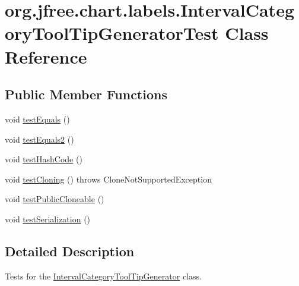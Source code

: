 \hypertarget{classorg_1_1jfree_1_1chart_1_1labels_1_1_interval_category_tool_tip_generator_test}{}\section{org.\+jfree.\+chart.\+labels.\+Interval\+Category\+Tool\+Tip\+Generator\+Test Class Reference}
\label{classorg_1_1jfree_1_1chart_1_1labels_1_1_interval_category_tool_tip_generator_test}
\subsection*{Public Member Functions}
\begin{DoxyCompactItemize}
\item 
void \mbox{\hyperlink{classorg_1_1jfree_1_1chart_1_1labels_1_1_interval_category_tool_tip_generator_test_af10b3cec77fa70d35671408d3254f662}{test\+Equals}} ()
\item 
void \mbox{\hyperlink{classorg_1_1jfree_1_1chart_1_1labels_1_1_interval_category_tool_tip_generator_test_aa8210340e8f440c2a679054c2d3cdc5e}{test\+Equals2}} ()
\item 
void \mbox{\hyperlink{classorg_1_1jfree_1_1chart_1_1labels_1_1_interval_category_tool_tip_generator_test_a1a005588b2204d54be1a3e8fc2eb9704}{test\+Hash\+Code}} ()
\item 
void \mbox{\hyperlink{classorg_1_1jfree_1_1chart_1_1labels_1_1_interval_category_tool_tip_generator_test_a89334c34c2360764355484ba0e68b4ca}{test\+Cloning}} ()  throws Clone\+Not\+Supported\+Exception 
\item 
void \mbox{\hyperlink{classorg_1_1jfree_1_1chart_1_1labels_1_1_interval_category_tool_tip_generator_test_ac05c0e26b99a3c728a50c37a8ae7f16f}{test\+Public\+Cloneable}} ()
\item 
void \mbox{\hyperlink{classorg_1_1jfree_1_1chart_1_1labels_1_1_interval_category_tool_tip_generator_test_a9b6f2892021c0e6766ce2a5aa9af2351}{test\+Serialization}} ()
\end{DoxyCompactItemize}


\subsection{Detailed Description}
Tests for the \mbox{\hyperlink{classorg_1_1jfree_1_1chart_1_1labels_1_1_interval_category_tool_tip_generator}{Interval\+Category\+Tool\+Tip\+Generator}} class. 

